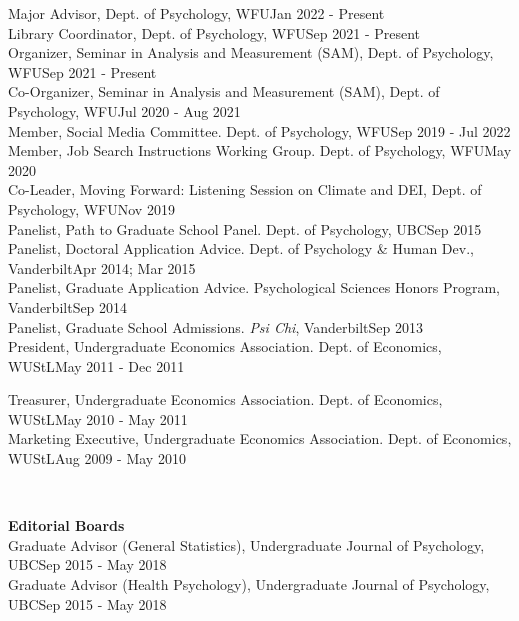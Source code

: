 Major Advisor, Dept. of Psychology, WFU\hfill {Jan 2022 - Present}\smallskip\\
Library Coordinator, Dept. of Psychology, WFU\hfill {Sep 2021 - Present}\smallskip\\
Organizer, Seminar in Analysis and Measurement (SAM), Dept. of Psychology, WFU\hfill {Sep 2021 - Present}\smallskip\\
Co-Organizer, Seminar in Analysis and Measurement (SAM), Dept. of Psychology, WFU\hfill {Jul 2020 - Aug 2021}\smallskip\\
Member, Social Media Committee. Dept. of Psychology, WFU\hfill {Sep 2019 - Jul 2022}\smallskip\\
Member, Job Search Instructions Working Group. Dept. of Psychology, WFU\hfill{May 2020}\smallskip\\
Co-Leader, Moving Forward: Listening Session on Climate and DEI, Dept. of Psychology, WFU\hfill {Nov 2019}\smallskip\\
Panelist, Path to Graduate School Panel. Dept. of Psychology, UBC\hfill {Sep 2015}\smallskip\\
Panelist, Doctoral Application Advice. Dept. of Psychology \& Human Dev., Vanderbilt\hfill {Apr 2014; Mar 2015}\smallskip\\
Panelist, Graduate Application Advice. Psychological Sciences Honors Program, Vanderbilt\hfill {Sep 2014}\smallskip\\
Panelist, Graduate School Admissions. \textit{Psi Chi}, Vanderbilt\hfill{Sep 2013}\smallskip\\
President, Undergraduate Economics Association. Dept. of Economics, WUStL\hfill{May 2011 - Dec 2011}\smallskip\\
\begin{minipage}{\linewidth}\vspace{1.1mm} Treasurer, Undergraduate Economics Association. Dept. of Economics, WUStL\hfill{May 2010 - May 2011}\smallskip\\
Marketing Executive, Undergraduate Economics Association. Dept. of Economics, WUStL\hfill {Aug 2009 - May 2010}\end{minipage}\medskip\\
%
%
\begin{minipage}{\linewidth}\vspace{1.1mm} {\large \textbf{Editorial Boards}}\\
Graduate Advisor (General Statistics), Undergraduate Journal of Psychology, UBC\hfill{Sep 2015 - May 2018}\smallskip\\
Graduate Advisor (Health Psychology), Undergraduate Journal of Psychology, UBC\hfill{Sep 2015 - May 2018}\end{minipage}\medskip\\
